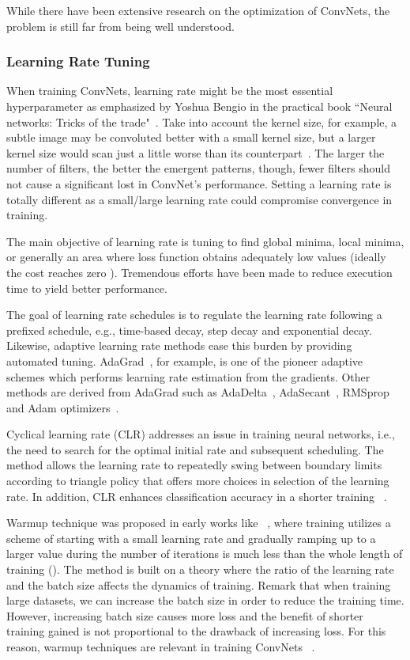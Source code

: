 \documentclass{ieeeaccess}
\begin{document}
While there have been extensive research on the optimization of ConvNets, the problem is still far from being well understood.
\subsubsection{Learning Rate Tuning}
\label{sec:learningrateworks}
When training ConvNets, learning rate might be the most essential hyperparameter as emphasized by Yoshua Bengio in the practical book ``Neural networks: Tricks of the trade"~\cite{bengio2012practical}. Take into account the kernel size, for example, a subtle image may be convoluted better with a small kernel size, but a larger kernel size would scan just a little worse than its counterpart~\cite{tomen2021spectral}. The larger the number of filters, the better the emergent patterns, though, fewer filters should not cause a significant lost in ConvNet's performance. Setting a learning rate is totally different as a small/large learning rate could compromise convergence in training.

The main objective of learning rate is tuning to find global minima, local minima, or generally an area where loss function obtains adequately low values (ideally the cost reaches zero ). Tremendous efforts have been made to reduce execution time to yield better performance.

The goal of learning rate schedules is to regulate the learning rate following a prefixed schedule, e.g., time-based decay, step decay and exponential decay. Likewise, adaptive learning rate methods ease this burden by providing automated tuning. AdaGrad~\cite{duchi2011adaptive}, for example, is one of the pioneer adaptive schemes which performs learning rate estimation from the gradients. Other methods are derived from AdaGrad such as AdaDelta~\cite{zeiler2012adadelta}, AdaSecant~\cite{gulcehre2014adasecant}, RMSprop~\cite{tieleman2012lecture} and Adam optimizers~\cite{kingma2014adam}. 




Cyclical learning rate (CLR) addresses an issue in training neural networks, i.e., the need to search for the optimal initial rate and subsequent scheduling. The method allows the learning rate to repeatedly swing between boundary limits according to triangle policy that offers more choices in selection of the learning rate. In addition, CLR enhances classification accuracy in a shorter training ~\cite{smith2017cyclical}.

Warmup technique was proposed in early works like ~\cite{vaswani2017attention}, where training utilizes a scheme of starting with a small learning rate and gradually ramping up to a larger value during the number of iterations is much less than the whole length of training (). The method is built on a theory where the ratio of the learning rate and the batch size affects the dynamics of training. Remark that when training large datasets, we can increase the batch size in order to reduce the training time. However, increasing batch size causes more loss and the benefit of shorter training gained is not proportional to the drawback of increasing loss. For this reason, warmup techniques are relevant in training ConvNets ~\cite{vaswani2017attention,goyal2017accurate,gotmare2018closer,liu2019variance}.
\end{document}
